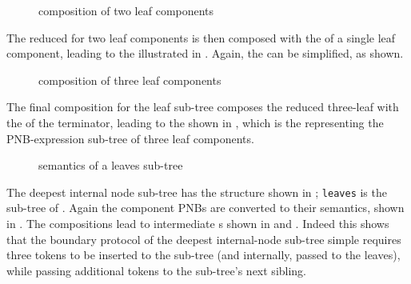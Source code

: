 
\begin{figure}[ht]
    \centering
    \caption{\TNFA{} composition of two leaf components}
    \label{fig:firstLeafCompositionTNFA}
\end{figure}

The reduced \TNFA{} for two leaf components is then composed with the
\TNFA{} of a single leaf component, leading to the \TNFA{} illustrated in
. Again, the \TNFA{} can be simplified,
as shown.

\begin{figure}[ht]
    \centering
    \caption{\TNFA{} composition of three leaf components}
    \label{fig:secondLeafCompositionTNFA}
\end{figure}

The final composition for the leaf sub-tree composes the reduced three-leaf
\TNFA{} with the \TNFA{} of the terminator, leading to the \TNFA{} shown in
, which is the \TNFA{} representing the
PNB-expression sub-tree of three leaf components.

\begin{figure}[ht]
    \centering
    \usebox\leavesBox
    \caption{\TNFA{} semantics of a leaves sub-tree}
    \label{fig:leavesSubtreeTNFA}
\end{figure}


The deepest internal node sub-tree has the structure shown in
; \texttt{leaves} is the
sub-tree of . Again the component PNBs are converted
to their \TNFA{} semantics, shown in . The
compositions lead to intermediate \TNFA{}s shown in 
and . Indeed this \TNFA{} shows that
the boundary protocol of the deepest internal-node sub-tree simple requires
three tokens to be inserted to the sub-tree (and internally, passed to the
leaves), while passing additional tokens to the sub-tree's next sibling.

